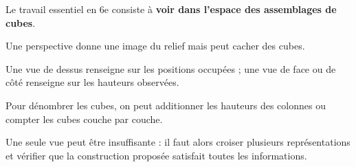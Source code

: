 \begin{aretenir}
Le travail essentiel en 6e consiste à \textbf{voir dans l'espace des assemblages de cubes}.

Une perspective donne une image du relief mais peut cacher des cubes.

Une vue de dessus renseigne sur les positions occupées ; une vue de face ou de côté renseigne sur les hauteurs observées.

Pour dénombrer les cubes, on peut additionner les hauteurs des colonnes ou compter les cubes couche par couche.

Une seule vue peut être insuffisante : il faut alors croiser plusieurs représentations et vérifier que la construction proposée satisfait toutes les informations.
\end{aretenir}
